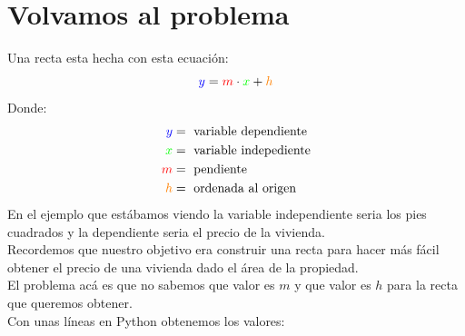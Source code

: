 \documentclass{article}
\begin{document}
\section{Volvamos al problema}
Una recta esta hecha con esta ecuación:
\begin{equation*}
    \textcolor{blue}{y} = \textcolor{red}{m}\cdot \textcolor{green}{x} +\textcolor{orange}{h}
\end{equation*}
Donde:
\begin{align*}
    \textcolor{blue}{y} &= \text{ variable dependiente}\\
    \textcolor{green}{x} &= \text{ variable indepediente}\\
    \textcolor{red}{m} &= \text{ pendiente}\\
    \textcolor{orange}{h} &= \text{ ordenada al origen}
\end{align*}
En el ejemplo que estábamos viendo la variable independiente seria los pies cuadrados y la dependiente seria el precio de la vivienda.\\
Recordemos que nuestro objetivo era construir una recta para hacer más fácil obtener el precio de una vivienda dado el área de la propiedad.\\
El problema acá es que no sabemos que valor es $m$ y que valor es $h$ para la recta que queremos obtener.\\
Con unas líneas en Python obtenemos los valores:
\end{document}
